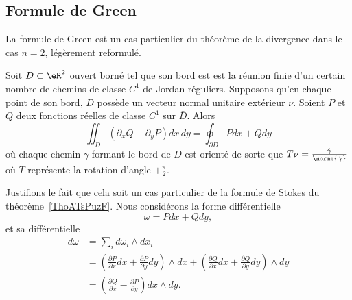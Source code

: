 \subsection{Formule de Green}

La formule de Green est un cas particulier du théorème de la divergence dans le cas \( n = 2\), légèrement reformulé.
\begin{theorem}     \label{THOooQSWMooAZasTl}
	Soit \( D \subset \eR^2\) ouvert borné tel que son bord est est la réunion finie d'un certain nombre de chemins de classe \( C^1\) de Jordan réguliers.  Supposons qu'en chaque point de son bord, \( D\) possède un vecteur normal unitaire extérieur \( \nu\). Soient \( P\) et \( Q\) deux fonctions réelles de classe \( C^1\) sur \( \bar D\). Alors
	\begin{equation}  \label{EqYLblSqV}
		\iint_D (\partial_xQ - \partial_yP)dx\,dy = \oint_{\partial D}
		Pd x + Q d y
	\end{equation}
	où chaque chemin \( \gamma\) formant le bord de \( D\) est orienté de
	sorte que \( T \nu = \frac{\dot\gamma}{\norme{\dot\gamma}}\) où \( T\)
	représente la rotation d'angle \( +\frac\pi2\).
\end{theorem}

Justifions le fait que cela soit un cas particulier de la formule de Stokes du théorème~\ref{ThoATsPuzF}. Nous considérons la forme différentielle
\begin{equation}
	\omega=Pdx+Qdy,
\end{equation}
et sa différentielle
\begin{subequations}
	\begin{align}
		d\omega & =\sum_id\omega_i\wedge dx_i                                                                                                                                                                      \\
		        & =\left( \frac{ \partial P }{ \partial x }dx+\frac{ \partial P }{ \partial y }dy \right)\wedge dx+\left( \frac{ \partial Q }{ \partial x }dx+\frac{ \partial Q }{ \partial y }dy \right)\wedge dy \\
		        & =\left( \frac{ \partial Q }{ \partial x }-\frac{ \partial P }{ \partial y } \right)dx\wedge dy.
	\end{align}
\end{subequations}

